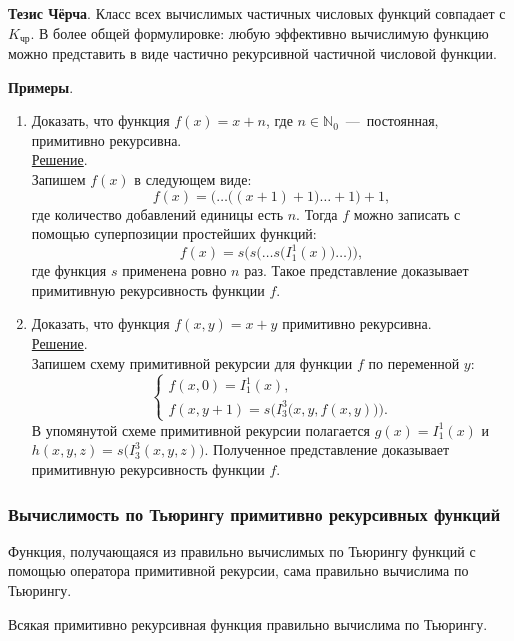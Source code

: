 \textbf{Тезис Чёрча}. Класс всех вычислимых частичных числовых функций совпадает с $K_{\text{чр}}$. В более общей формулировке: любую эффективно вычислимую функцию можно представить в виде частично рекурсивной частичной числовой функции.

\textbf{Примеры}.
\begin{enumerate}
    \item Доказать, что функция $f(x) = x + n$, где $n \in \mathbb{N}_0$~---~постоянная, примитивно рекурсивна. \\
    \underline{Решение}. \\
    Запишем $f(x)$ в следующем виде:
    \[
        f(x) = \Big(\dots\big((x + 1) + 1\big) \dots + 1\Big) + 1,
    \]
    где количество добавлений единицы есть $n$. Тогда $f$ можно записать с помощью суперпозиции простейших функций:
    \[
        f(x) = s\bigg(s\Big(\dots s\big(I_1^1(x)\big) \dots\Big)\bigg),
    \]
    где функция $s$ применена ровно $n$ раз. Такое представление доказывает примитивную рекурсивность функции $f$.
    \item Доказать, что функция $f(x, y) = x + y$ примитивно рекурсивна. \\
    \underline{Решение}. \\
    Запишем схему примитивной рекурсии для функции $f$ по переменной $y$:
    \[
        \begin{cases}
            f(x, 0) = I_1^1(x), \\
            f(x, y + 1) = s\Big(I_3^3\big(x, y, f(x, y)\big)\Big).
        \end{cases}
    \]
    В упомянутой схеме примитивной рекурсии полагается $g(x) = I_1^1(x)$ и $h(x, y, z) = s\big(I_3^3(x, y, z)\big)$. Полученное представление доказывает примитивную рекурсивность функции $f$.
\end{enumerate}

\vspace*{2cm}
\subsubsection{Вычислимость по Тьюрингу примитивно рекурсивных функций}
\begin{theorem}
    Функция, получающаяся из правильно вычислимых по Тьюрингу функций с помощью оператора примитивной рекурсии, сама правильно вычислима по Тьюрингу.
\end{theorem}
\begin{corollary*}
    Всякая примитивно рекурсивная функция правильно вычислима по Тьюрингу. 
\end{corollary*}


